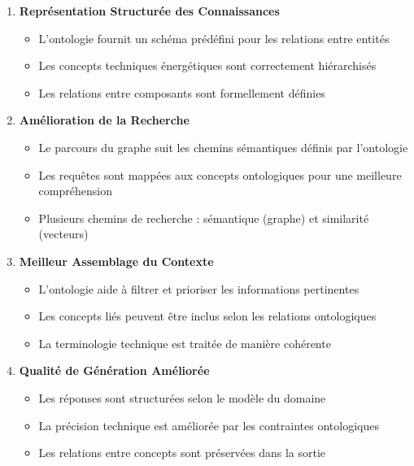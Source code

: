 \documentclass[a4paper,11pt]{report}
\providecommand{\tightlist}{\setlength{\itemsep}{0pt}\setlength{\parskip}{0pt}}
\begin{document}
\begin{enumerate}
\def\labelenumi{\arabic{enumi}.}
\item
  \textbf{Représentation Structurée des Connaissances}

  \begin{itemize}
  \tightlist
  \item
    L'ontologie fournit un schéma prédéfini pour les relations entre entités
  \item
    Les concepts techniques énergétiques sont correctement hiérarchisés
  \item
    Les relations entre composants sont formellement définies
  \end{itemize}
\item
  \textbf{Amélioration de la Recherche}

  \begin{itemize}
  \tightlist
  \item
    Le parcours du graphe suit les chemins sémantiques définis par l'ontologie
  \item
    Les requêtes sont mappées aux concepts ontologiques pour une meilleure compréhension
  \item
    Plusieurs chemins de recherche : sémantique (graphe) et similarité (vecteurs)
  \end{itemize}
\item
  \textbf{Meilleur Assemblage du Contexte}

  \begin{itemize}
  \tightlist
  \item
    L'ontologie aide à filtrer et prioriser les informations pertinentes
  \item
    Les concepts liés peuvent être inclus selon les relations ontologiques
  \item
    La terminologie technique est traitée de manière cohérente
  \end{itemize}
\item
  \textbf{Qualité de Génération Améliorée}

  \begin{itemize}
  \tightlist
  \item
    Les réponses sont structurées selon le modèle du domaine
  \item
    La précision technique est améliorée par les contraintes ontologiques
  \item
    Les relations entre concepts sont préservées dans la sortie
  \end{itemize}
\end{enumerate}
\end{document}
